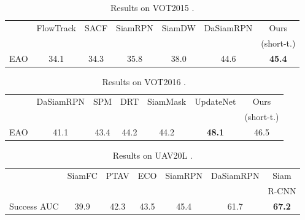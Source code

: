 \documentclass[10pt,twocolumn,letterpaper]{article}
\begin{document}
 \begin{table}[t]
\centering{}\setlength{\tabcolsep}{2pt}
\footnotesize
\begin{tabular}{lcccccc}
\toprule
 & {\footnotesize{}FlowTrack} & {\footnotesize{}SACF} & {\footnotesize{}SiamRPN} & {\footnotesize{}SiamDW} & {\footnotesize{}DaSiamRPN} & {\footnotesize{}Ours}\tabularnewline
 & {\footnotesize{}\cite{Zhu18CVPR}} & {\footnotesize{}\cite{Zhang18ECCV_Aligned}} & {\footnotesize{}\cite{Li18CVPRSiamRPN}} & {\footnotesize{}\cite{Zhang19CVPR}} & {\footnotesize{}\cite{Zhu18ECCV}} & {\scriptsize{}(short-t.)} \tabularnewline 
\midrule
EAO & {\footnotesize{}34.1} & {\footnotesize{}34.3} & {\footnotesize{}35.8} & {\footnotesize{}38.0} & {\footnotesize{}44.6} & {\footnotesize{}\textbf{45.4}}\tabularnewline
\bottomrule
\end{tabular}
\caption{\label{tab:vot15}Results on VOT2015 \cite{Kristan15ICCVW}.}
\end{table}
 \begin{table}[t]
\centering{}\setlength{\tabcolsep}{2pt}
\footnotesize
\begin{tabular}{lcccccc}
\toprule
 & {\footnotesize{}DaSiamRPN} & {\footnotesize{}SPM} & {\footnotesize{}DRT} & {\footnotesize{}SiamMask} & {\footnotesize{}UpdateNet} & {\footnotesize{}Ours}\tabularnewline
 & {\footnotesize{}\cite{Zhu18ECCV}} & {\footnotesize{}\cite{wang2019spm}} & {\footnotesize{}\cite{Sun18CVPR_Reliability}} & {\footnotesize{}\cite{Wang19CVPR}} & {\footnotesize{}\cite{Zhang19ICCV}} & {\scriptsize{}(short-t.)} \tabularnewline 
\midrule
EAO & {\footnotesize{}41.1} & {\footnotesize{}43.4} & {\footnotesize{}44.2} & {\footnotesize{}44.2} & {\footnotesize{}\textbf{48.1}} & {\footnotesize{}46.5}\tabularnewline
\bottomrule
\end{tabular}
\caption{\label{tab:vot16}Results on VOT2016 \cite{Kristan16ECCVW}.}
\end{table}
 \begin{table}[t]
\centering{}\setlength{\tabcolsep}{2pt}
\footnotesize
\begin{tabular}{lcccccc}
\toprule 
 & {\footnotesize{}SiamFC} & {\footnotesize{}PTAV} & {\footnotesize{}ECO} & {\footnotesize{}SiamRPN} & {\footnotesize{}{}DaSiamRPN } & {\footnotesize{}{}Siam}\tabularnewline
 & {\footnotesize{}\cite{Bertinetto2016ECCV}} & {\footnotesize{}\cite{Fan17CVPR}} & {\footnotesize{}\cite{Danelljan17CVPR}} & {\footnotesize{}\cite{Li18CVPRSiamRPN}} & {\footnotesize{}{}\cite{Zhu18ECCV} } & {\footnotesize{}{}R-CNN }\tabularnewline
\midrule 
{\footnotesize{}Success AUC } & {\footnotesize{}39.9} & {\footnotesize{}42.3} & {\footnotesize{}43.5} & {\footnotesize{}45.4} & {\footnotesize{}{}61.7 } & {\footnotesize{}{}}\textbf{\footnotesize{}67.2}\tabularnewline
\bottomrule
\end{tabular}
\caption{\label{tab:uav20L}Results on UAV20L \cite{Mueller16ECCV}.}
\end{table}
 
\end{document}
